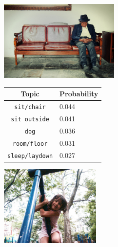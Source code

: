 \documentclass[twoside,twocolumn]{article}
\begin{document}
\begin{figure}
\begin{subfigure}{\textwidth}
    \centering
    \begin{minipage}[t][4cm]{.5\linewidth}
    \centering
    \vspace{0pt}
    \includegraphics[height=4cm]{Images/4862204000.jpg}
    \end{minipage}\hfill
    \begin{minipage}[t]{.5\textwidth}
    \centering
    \vspace{0pt}
    \begin{tabular}{cl}
            Topic                           & Probability\\
            \hline
            \texttt{sit/chair}             & 0.044 \\
            \texttt{sit outside}                   & 0.041 \\
            \texttt{dog}                 & 0.036 \\
            \texttt{room/floor}           & 0.031 \\
            \texttt{sleep/laydown}        & 0.027\\
            \hline
        \end{tabular}
    \end{minipage}
\end{subfigure}
\vspace*{4mm}
\begin{subfigure}{\textwidth}
    \centering
    \begin{minipage}[t][4cm]{.5\linewidth}
    \centering
    \vspace{0pt}
    \includegraphics[height=4cm]{Images/3643021980.jpg}

\end{minipage}
\end{subfigure}
\end{figure}
\end{document}
